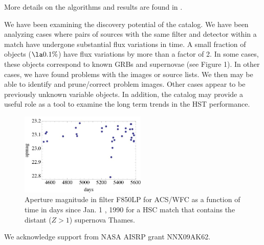 More details on the algorithms and results are found in \cite{2012arXiv1206.0644B}.

We have been examining the discovery potential of the catalog. We have been analyzing cases where pairs of sources with the same filter and detector within a match have undergone substantial flux variations in time. A small fraction of objects ($\la 0.1 \%$) have flux variations by more than a factor of 2. In some cases, these    objects correspond to known GRBs and supernovae (see Figure 1).  In other cases, we have found problems with the images or source lists. We then may be able to identify and prune/correct problem images. Other cases appear to be previously unknown variable objects. In addition, the catalog may provide a useful role as a tool to examine the long term trends in the HST performance.


\begin{figure}
\centering
\includegraphics[width=6.0cm]{part8/Lubow_O21/O21_1.eps}
\caption{Aperture magnitude in filter F850LP for ACS/WFC as a function of time in days since Jan. 1 , 1990 for a HSC match that contains the distant ($Z> 1$) supernova Thames.}
\end{figure}


\acknowledgements We acknowledge support from NASA AISRP grant NNX09AK62.


